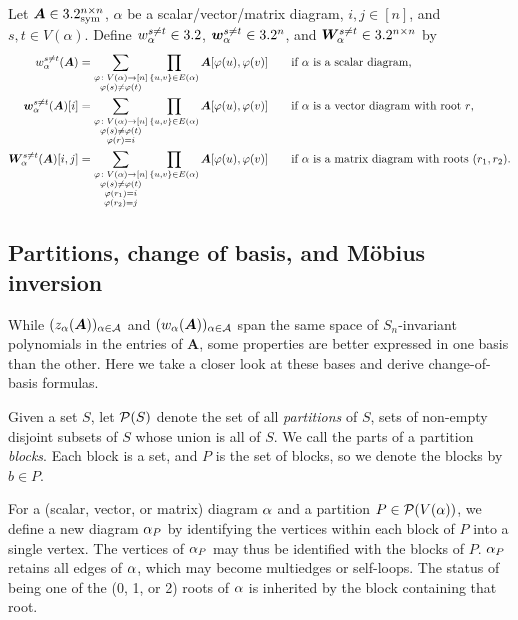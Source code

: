 \begin{definition}
    Let ${\bm A}\in 3.2_{\mathrm{sym}}^{n\times n}$, $\alpha$ be a scalar/vector/matrix diagram,
    $i,j\in [n]$, and $s,t\in V(\alpha)$. Define $w_\alpha^{s\neq t}\in 3.2$, ${\bm w}_\alpha^{s\neq t}\in 3.2^n$, and ${\bm W}_\alpha^{s\neq t}\in 3.2^{n\times n}$ by
    \begin{alignat*}{2}
        w_\alpha^{s\neq t}({\bm A}) &= \sum_{\substack{\varphi\colon V(\alpha)\to [n]\\\varphi(s)\neq \varphi(t)}} \prod_{\{u,v\}\in E(\alpha)} {\bm A}[\varphi(u),\varphi(v)] && \text{if $\alpha$ is a scalar diagram,}\\
        {\bm w}^{s\neq t}_\alpha({\bm A})[i] &= \sum_{\substack{\varphi\colon V(\alpha)\to [n]\\\varphi(s)\neq \varphi(t)\\\varphi(r) = i}} \prod_{\{u,v\}\in E(\alpha)} {\bm A}[\varphi(u),\varphi(v)] && \text{if $\alpha$ is a vector diagram with root $r$,}\\
        {\bm W}^{s\neq t}_\alpha({\bm A})[i,j] &= \sum_{\substack{\varphi\colon V(\alpha)\to [n]\\\varphi(s)\neq \varphi(t)\\\varphi(r_1)=i\\\varphi(r_2)=j}} \prod_{\{u,v\}\in E(\alpha)} {\bm A}[\varphi(u),\varphi(v)] \quad && \text{if $\alpha$ is a matrix diagram with roots $(r_1, r_2)$.}
    \end{alignat*}
\end{definition}

\subsection{Partitions, change of basis, and M{\"o}bius inversion}
\label{sec:mobius}

While $(z_\alpha({\bm A}))_{\alpha\in {\cal A}}$ and
$(w_\alpha({\bm A}))_{\alpha\in {\cal A}}$ span the
same space of $S_n$-invariant polynomials in the entries of $\bm A$, some
properties are better expressed in one basis
than the other. 
Here we take a closer look at these bases and derive
change-of-basis formulas.

Given a set $S$, let ${\cal P}(S)$ denote the set of all \emph{partitions} of $S$, sets of non-empty disjoint subsets of $S$ whose union is all of $S$.
We call the parts of a partition \emph{blocks}.
Each block is a set, and $P$ is the set of blocks, so we denote the blocks by $b \in P$.

For a (scalar, vector, or matrix) diagram $\alpha$ and a partition $P \in {\cal P}(V(\alpha))$,
we define a new diagram $\alpha_P$
by identifying the vertices within each block of $P$ into a single vertex.
The vertices of $\alpha_P$ may thus be identified with the blocks of $P$.
$\alpha_P$ retains all edges of $\alpha$, which may become multiedges or self-loops.
The status of being one of the (0, 1, or 2) roots of $\alpha$ is inherited by the block containing that root. 

